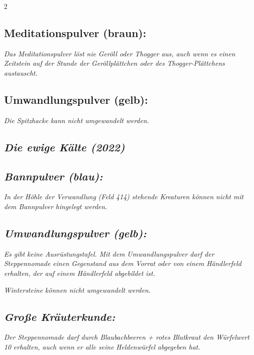 \documentclass[10pt, a4paper, oneside]{book}
\newcommand{\fan}[1]{\textit{#1}}
\begin{document}
\begin{multicols*}{2}
\begin{bgcolor}[color-dz]
\subsection{Meditationspulver (braun):}

\fan{Das Meditationspulver löst nie Geröll oder Thogger aus, auch wenn es einen Zeitstein auf der Stunde der Geröllplättchen oder des Thogger-Plättchens austauscht.}



\subsection{Umwandlungspulver (gelb):}

\fan{Die Spitzhacke kann nicht umgewandelt werden.}

\end{bgcolor}




\begin{bgcolor}
\section{\fan{Die ewige Kälte (2022)}}


\subsection{\fan{Bannpulver (blau):}}

\fan{In der Höhle der Verwandlung (Feld 414) stehende Kreaturen können nicht mit dem Bannpulver hingelegt werden.}



\subsection{\fan{Umwandlungspulver (gelb):}}


\fan{Es gibt keine Ausrüstungstafel. Mit dem Umwandlungspulver darf der Steppennomade einen Gegenstand aus dem Vorrat oder von einem Händlerfeld erhalten, der auf einem Händlerfeld abgebildet ist.}

\fan{Wintersteine können nicht umgewandelt werden.}


\subsection{\fan{Große Kräuterkunde:}}

\fan{Der Steppennomade darf durch Blaubachbeeren + rotes Blutkraut den Würfelwert 10 erhalten, auch wenn er alle seine Heldenwürfel abgegeben hat.}




\end{bgcolor}
\end{multicols*}
\end{document}
